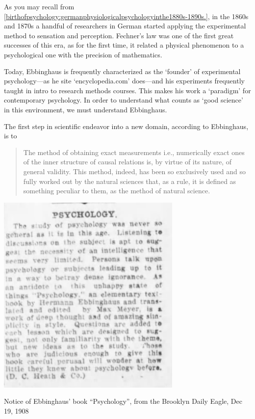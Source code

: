 \begin{refsection}
As you may recall from \ref{birthofpsychology:germanphysiologicalpsychologyinthe1880s-1890s.}, in the 1860s and 1870s a handful of researchers in German started applying the experimental method to sensation and perception. Fechner’s law was one of the first great successes of this era, as for the first time, it related a physical phenomenon to a psychological one with the precision of mathematics. 

Today, Ebbinghaus is frequently characterized as the ‘founder’ of experimental psychology---as he site ‘encyclopedia.com’ does---and his experiments frequently taught in intro to research methods courses. This makes his work a ‘paradigm’ for contemporary psychology. In order to understand what counts as ‘good science’ in this environment, we must understand Ebbinghaus.

The first step in scientific endeavor into a new domain, according to Ebbinghaus, is to 

\begin{quote}

The method of obtaining exact measurements i.e., numerically exact ones of the inner structure of causal relations is, by virtue of its nature, of general validity. This method, indeed, has been so exclusively used and so fully worked out by the natural sciences that, as a rule, it is defined as something peculiar to them, as the method of natural science. ~\citep[p. 7]{Ebbinghaus:1885ud}
\end{quote}

\begin{marginfigure}
 \begin{center}

     \includegraphics{../images/ebbinghaus-clip.png}
\end{center}
 \caption{Notice of Ebbinghaus’ book “Psychology”, from the Brooklyn Daily Eagle, Dec 19, 1908}
\label{fig: ebbinghaus-clip}
\end{marginfigure}



\end{refsection}
